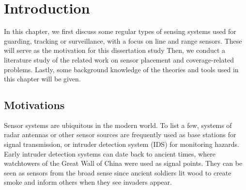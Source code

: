 
\chapter{Introduction} 
\thispagestyle{myheadings} 
In this chapter, we first discuss some regular types of sensing systems 
used for guarding, tracking or surveillance, 
with a focus on line and range sensors. 
These will serve as the motivation for this dissertation study
Then, we conduct a literature study of the related work on sensor placement and 
coverage-related problems. 
Lastly, some background knowledge of the theories and tools used in this chapter will be given. 

\section{Motivations} 
Sensor systems are ubiquitous in the modern world. 
To list a few, systems of radar antennas 
or other sensor sources are frequently used as base stations for signal transmission, 
or intruder detection system (IDS) for monitoring hazards. 
Early intruder detection systems can date back to ancient times, where 
watchtowers of the Great Wall of China were used as signal points. 
They can be seen as sensors from the broad sense 
since ancient soldiers lit wood to create smoke and inform others when they see invaders appear. 
